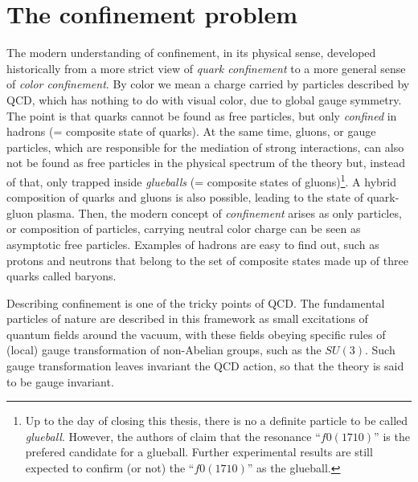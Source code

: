 \section{The confinement problem}


The modern understanding of confinement, in its physical sense, developed historically from a
more strict view of \emph{quark confinement} to a more general sense of \emph{color
confinement}. By color we mean a charge carried by particles described by QCD, which has
nothing to do with visual color, due to global gauge symmetry. The point is that quarks cannot
be found as free particles, but only \emph{confined} in hadrons (= composite state of quarks).
At the same time, gluons, or gauge particles, which are responsible for the mediation of
strong interactions, can also not be found as free particles in the physical spectrum of the
theory but, instead of that, only trapped inside \emph{glueballs} (= composite states of
gluons)\footnote{Up to the day of closing this thesis, there is no a definite particle to be
called {\it glueball}. However, the authors of \cite{Brunner:2015yha} claim that the resonance
``$f0(1710)$'' is the prefered candidate for a glueball. Further experimental results are
still expected to confirm (or not) the ``$f0(1710)$'' as the glueball.}. A hybrid composition of quarks and gluons is also possible, leading to the state of
quark-gluon plasma. Then, the modern concept of \emph{confinement} arises as only particles, or
composition of particles, carrying neutral color charge can be seen as asymptotic free
particles. Examples of hadrons are easy to find out, such as protons and neutrons that belong
to the set of composite states made up of three quarks called baryons.


Describing confinement is one of the tricky points of QCD. The fundamental particles of nature
are described in this framework as small excitations of quantum fields around the vacuum, with
these fields obeying specific rules of (local) gauge transformation of non-Abelian groups, such
as the $SU(3)$. Such gauge transformation leaves invariant the QCD action, so that the theory
is said to be gauge invariant.

